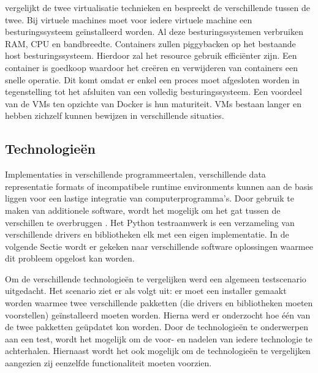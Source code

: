\citet{merkel2014docker} vergelijkt de twee virtualisatie technieken en bespreekt de verschillende tussen de twee.
Bij virtuele machines moet voor iedere virtuele machine een besturingssysteem geïnstalleerd worden.
Al deze besturingssystemen verbruiken RAM, CPU en bandbreedte.
Containers zullen piggybacken op het bestaande host besturingssysteem.
Hierdoor zal het resource gebruik efficiënter zijn.
Een container is goedkoop waardoor het creëren en verwijderen van containers een snelle operatie.
Dit komt omdat er enkel een proces moet afgesloten worden in tegenstelling tot het afsluiten van een volledig besturingssysteem.
Een voordeel van de VMs ten opzichte van Docker is hun maturiteit.
VMs bestaan langer en hebben zichzelf kunnen bewijzen in verschillende situaties.

\subsection{Technologieën}\label{sec:technologieen}
Implementaties in verschillende programmeertalen, verschillende data representatie formats of incompatibele runtime environments kunnen aan de basis liggen voor een lastige integratie van computerprogramma's.
Door gebruik te maken van additionele software, wordt het mogelijk om het gat tussen de verschillen te overbruggen  \citep{callahan1998software}.
Het Python testraamwerk is een verzameling van verschillende drivers en bibliotheken elk met een eigen implementatie.
In de volgende Sectie wordt er gekeken naar verschillende software oplossingen waarmee dit probleem opgelost kan worden.

Om de verschillende technologieën te vergelijken werd een algemeen testscenario uitgedacht.
Het scenario ziet er als volgt uit: er moet een installer gemaakt worden waarmee twee verschillende pakketten (die drivers en bibliotheken moeten voorstellen) geïnstalleerd moeten worden.
Hierna werd er onderzocht hoe één van de twee pakketten geüpdatet kon worden.
Door de technologieën te onderwerpen aan een test, wordt het mogelijk om de voor- en nadelen van iedere technologie te achterhalen.
Hiernaast wordt het ook mogelijk om de technologieën te vergelijken aangezien zij eenzelfde functionaliteit moeten voorzien.


